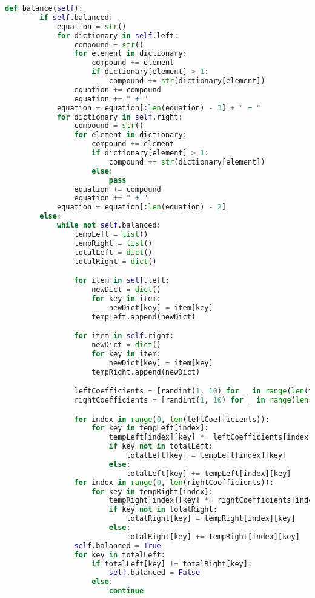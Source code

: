 \documentclass[a4paper,12pt]{article}
\begin{document}
\begin{lstlisting}[language=Python, caption=balance method, label={lst:balance_method}]
def balance(self):
        if self.balanced:
            equation = str()
            for dictionary in self.left:
                compound = str()
                for element in dictionary:
                    compound += element
                    if dictionary[element] > 1:
                        compound += str(dictionary[element])
                equation += compound
                equation += " + "
            equation = equation[:len(equation) - 3] + " = "
            for dictionary in self.right:
                compound = str()
                for element in dictionary:
                    compound += element
                    if dictionary[element] > 1:
                        compound += str(dictionary[element])
                    else:
                        pass
                equation += compound
                equation += " + "
            equation = equation[:len(equation) - 2]
        else:
            while not self.balanced:
                tempLeft = list()
                tempRight = list()
                totalLeft = dict()
                totalRight = dict()

                for item in self.left:
                    newDict = dict()
                    for key in item:
                        newDict[key] = item[key]
                    tempLeft.append(newDict)

                for item in self.right:
                    newDict = dict()
                    for key in item:
                        newDict[key] = item[key]
                    tempRight.append(newDict)

                leftCoefficients = [randint(1, 10) for _ in range(len(tempLeft))]
                rightCoefficients = [randint(1, 10) for _ in range(len(tempRight))]

                for index in range(0, len(leftCoefficients)):
                    for key in tempLeft[index]:
                        tempLeft[index][key] *= leftCoefficients[index]
                        if key not in totalLeft:
                            totalLeft[key] = tempLeft[index][key]
                        else:
                            totalLeft[key] += tempLeft[index][key]
                for index in range(0, len(rightCoefficients)):
                    for key in tempRight[index]:
                        tempRight[index][key] *= rightCoefficients[index]
                        if key not in totalRight:
                            totalRight[key] = tempRight[index][key]
                        else:
                            totalRight[key] += tempRight[index][key]
                self.balanced = True
                for key in totalLeft:
                    if totalLeft[key] != totalRight[key]:
                        self.balanced = False
                    else:
                        continue


\end{lstlisting}
\end{document}

